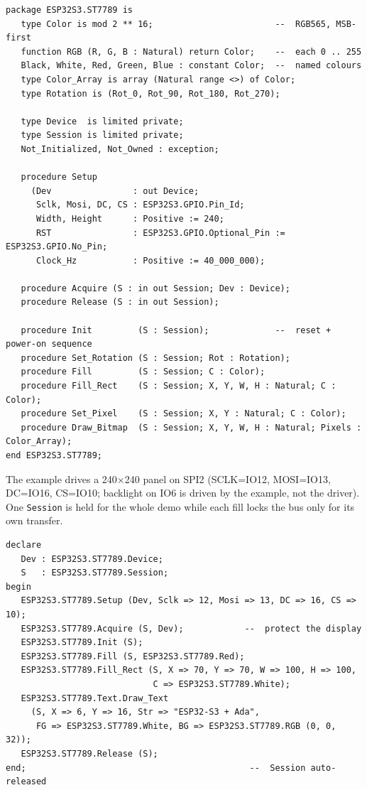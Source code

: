 \begin{lstlisting}
package ESP32S3.ST7789 is
   type Color is mod 2 ** 16;                        --  RGB565, MSB-first
   function RGB (R, G, B : Natural) return Color;    --  each 0 .. 255
   Black, White, Red, Green, Blue : constant Color;  --  named colours
   type Color_Array is array (Natural range <>) of Color;
   type Rotation is (Rot_0, Rot_90, Rot_180, Rot_270);

   type Device  is limited private;
   type Session is limited private;
   Not_Initialized, Not_Owned : exception;

   procedure Setup
     (Dev                : out Device;
      Sclk, Mosi, DC, CS : ESP32S3.GPIO.Pin_Id;
      Width, Height      : Positive := 240;
      RST                : ESP32S3.GPIO.Optional_Pin := ESP32S3.GPIO.No_Pin;
      Clock_Hz           : Positive := 40_000_000);

   procedure Acquire (S : in out Session; Dev : Device);
   procedure Release (S : in out Session);

   procedure Init         (S : Session);             --  reset + power-on sequence
   procedure Set_Rotation (S : Session; Rot : Rotation);
   procedure Fill         (S : Session; C : Color);
   procedure Fill_Rect    (S : Session; X, Y, W, H : Natural; C : Color);
   procedure Set_Pixel    (S : Session; X, Y : Natural; C : Color);
   procedure Draw_Bitmap  (S : Session; X, Y, W, H : Natural; Pixels : Color_Array);
end ESP32S3.ST7789;
\end{lstlisting}

The example drives a 240$\times$240 panel on SPI2 (SCLK=IO12, MOSI=IO13, DC=IO16,
CS=IO10; backlight on IO6 is driven by the example, not the driver). One
\texttt{Session} is held for the whole demo while each fill locks the bus only for
its own transfer.

\begin{lstlisting}
declare
   Dev : ESP32S3.ST7789.Device;
   S   : ESP32S3.ST7789.Session;
begin
   ESP32S3.ST7789.Setup (Dev, Sclk => 12, Mosi => 13, DC => 16, CS => 10);
   ESP32S3.ST7789.Acquire (S, Dev);            --  protect the display
   ESP32S3.ST7789.Init (S);
   ESP32S3.ST7789.Fill (S, ESP32S3.ST7789.Red);
   ESP32S3.ST7789.Fill_Rect (S, X => 70, Y => 70, W => 100, H => 100,
                             C => ESP32S3.ST7789.White);
   ESP32S3.ST7789.Text.Draw_Text
     (S, X => 6, Y => 16, Str => "ESP32-S3 + Ada",
      FG => ESP32S3.ST7789.White, BG => ESP32S3.ST7789.RGB (0, 0, 32));
   ESP32S3.ST7789.Release (S);
end;                                            --  Session auto-released
\end{lstlisting}

